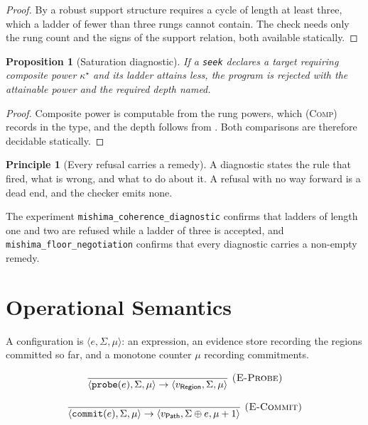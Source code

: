 \documentclass[11pt,twocolumn,a4paper]{article}
\newtheorem{proposition}[theorem]{Proposition}
\theoremstyle{definition}
\newtheorem{principle}[theorem]{Principle}
\theoremstyle{remark}
\newcommand{\pot}{\kappa}
\newcommand{\rec}{\mu}
\begin{document}
\begin{proof}
By  a robust support structure requires a cycle of length at
least three, which a ladder of fewer than three rungs cannot contain. The check
needs only the rung count and the signs of the support relation, both available
statically.
\end{proof}

\begin{proposition}[Saturation diagnostic]
\label{prop:satdiag}
If a \texttt{seek} declares a target requiring composite power $\pot^{\star}$ and
its ladder attains less, the program is rejected with the attainable power and
the required depth named.
\end{proposition}

\begin{proof}
Composite power is computable from the rung powers, which \textsc{(Comp)} records
in the type, and the depth follows from . Both comparisons are
therefore decidable statically.
\end{proof}

\begin{principle}[Every refusal carries a remedy]
\label{prin:remedy}
A diagnostic states the rule that fired, what is wrong, and what to do about it.
A refusal with no way forward is a dead end, and the checker emits none.
\end{principle}

The experiment \texttt{mishima\_coherence\_diagnostic} confirms that ladders of
length one and two are refused while a ladder of three is accepted, and
\texttt{mishima\_floor\_negotiation} confirms that every diagnostic carries a
non-empty remedy.

\section{Operational Semantics}
\label{sec:semantics}

A configuration is $\langle e, \Sigma, \rec\rangle$: an expression, an evidence
store recording the regions committed so far, and a monotone counter $\rec$
recording commitments.

\[
\frac{}{\langle \texttt{probe}(e), \Sigma, \rec\rangle \to
        \langle v_{\textsf{Region}}, \Sigma, \rec\rangle}
\ \textsc{(E-Probe)}
\]

\[
\frac{}{\langle \texttt{commit}(e), \Sigma, \rec\rangle \to
        \langle v_{\textsf{Path}}, \Sigma\oplus e, \rec+1\rangle}
\ \textsc{(E-Commit)}
\]
\end{document}
